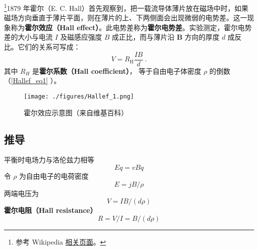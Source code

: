
\begin{issues}
\issueDraft
\end{issues}

\footnote{参考 Wikipedia \href{https://en.wikipedia.org/wiki/Hall_effect}{相关页面}。}1879 年霍尔（E. C. Hall）首先观察到，把一载流导体薄片放在磁场中时，如果磁场方向垂直于薄片平面，则在薄片的上、下两侧面会出现微弱的电势差。这一现象称为\textbf{霍尔效应（Hall effect）}。此电势差称为\textbf{霍尔电势差}。实验测定，霍尔电势差的大小与电流 $I$ 及磁感应强度 $B$ 成正比，而与薄片沿 $\mathbf B$ 方向的厚度 $d$ 成反比。它们的关系可写成：
\begin{equation}
V = R_{\mathrm{H}} \frac{I B}{d}~.
\end{equation}
其中 $R_H$ 是\textbf{霍尔系数（Hall coefficient）}， 等于自由电子体密度 $\rho$ 的倒数（\autoref{Hallef_eq1} ）。

\begin{figure}[ht]
\centering
\texttt{[image: ./figures/Hallef\_1.png]}
\caption{霍尔效应示意图（来自维基百科）} \label{Hallef_fig1}
\end{figure}

\subsection{推导}
平衡时电场力与洛伦兹力相等
\begin{equation}
Eq = vBq
\end{equation}
令 $\rho$ 为自由电子的电荷密度
\begin{equation}
E = jB/\rho
\end{equation}
两端电压为
\begin{equation}\label{Hallef_eq1}
V = IB/(d\rho)
\end{equation}
\textbf{霍尔电阻（Hall resistance）}
\begin{equation}
R = V/I = B/(d\rho)
\end{equation}
